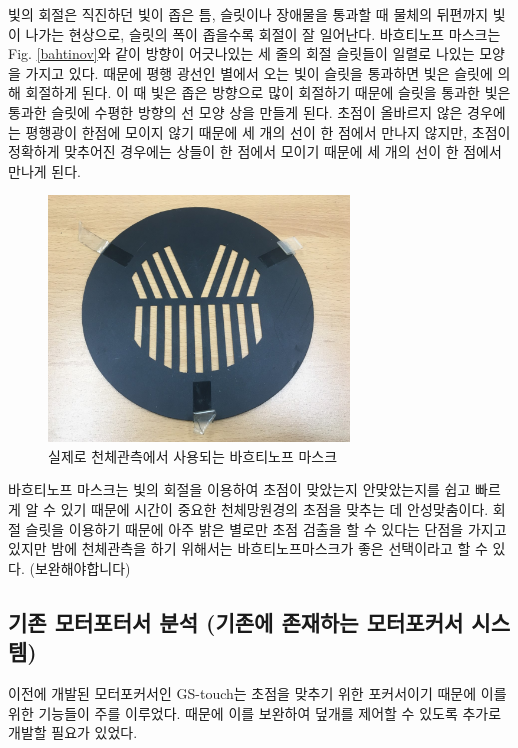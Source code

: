 \documentclass[twoside,11pt]{gshs_thesis}
\begin{document}
 빛의 회절은 직진하던 빛이 좁은 틈, 슬릿이나 장애물을 통과할 때 물체의 뒤편까지 빛이 나가는 현상으로, 슬릿의 폭이 좁을수록 회절이 잘 일어난다. 바흐티노프 마스크는 Fig. \ref{bahtinov}와 같이 방향이 어긋나있는 세 줄의 회절 슬릿들이 일렬로 나있는 모양을 가지고 있다. 때문에 평행 광선인 별에서 오는 빛이 슬릿을 통과하면 빛은 슬릿에 의해 회절하게 된다. 이 때 빛은 좁은 방향으로 많이 회절하기 때문에 슬릿을 통과한 빛은 통과한 슬릿에 수평한 방향의 선 모양 상을 만들게 된다. 초점이 올바르지 않은 경우에는 평행광이 한점에 모이지 않기 때문에 세 개의 선이 한 점에서 만나지 않지만, 초점이 정확하게 맞추어진 경우에는 상들이 한 점에서 모이기 때문에 세 개의 선이 한 점에서 만나게 된다.
 
 \begin{figure}[h]
 	\begin{center}
 		\includegraphics[width = 8cm]{bahtinov1}
 	\end{center}
 	\caption{실제로 천체관측에서 사용되는 바흐티노프 마스크}
 	\label{bahtinow}
 \end{figure}
 
 바흐티노프 마스크는 빛의 회절을 이용하여 초점이 맞았는지 안맞았는지를 쉽고 빠르게 알 수 있기 때문에 시간이 중요한 천체망원경의 초점을 맞추는 데 안성맞춤이다. 회절 슬릿을 이용하기 때문에 아주 밝은 별로만 초점 검출을 할 수 있다는 단점을 가지고 있지만 밤에 천체관측을 하기 위해서는 바흐티노프마스크가 좋은 선택이라고 할 수 있다.
(보완해야합니다)


\subsection{기존 모터포터서 분석 (기존에 존재하는 모터포커서 시스템)}


 이전에 개발된 모터포커서인 GS-touch는 초점을 맞추기 위한 포커서이기 때문에 이를 위한 기능들이 주를 이루었다. 때문에 이를 보완하여 덮개를 제어할 수 있도록 추가로 개발할 필요가 있었다.
 
\end{document}
